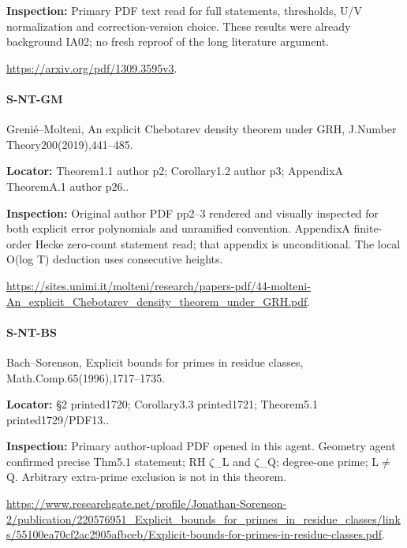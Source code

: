 \documentclass[11pt,a4paper]{article}
\begin{document}
\textbf{Inspection:} Primary PDF text read for full statements, thresholds, U/\allowbreak{}V normalization and correction-version choice.\allowbreak{} These results were already background IA02; no fresh reproof of the long literature argument.\allowbreak{}

\url{https://arxiv.org/pdf/1309.3595v3}.

\paragraph{S-NT-GM} Grenié–\allowbreak{}Molteni, An explicit Chebotarev density theorem under GRH, J.\allowbreak{}Number Theory200(2019),441–\allowbreak{}485.

\textbf{Locator:} Theorem1.\allowbreak{}1 author p2; Corollary1.\allowbreak{}2 author p3; AppendixA TheoremA.\allowbreak{}1 author p26.\allowbreak{}.

\textbf{Inspection:} Original author PDF pp2–\allowbreak{}3 rendered and visually inspected for both explicit error polynomials and unramified convention.\allowbreak{} AppendixA finite-order Hecke zero-count statement read; that appendix is unconditional.\allowbreak{} The local O(log T) deduction uses consecutive heights.\allowbreak{}

\url{https://sites.unimi.it/molteni/research/papers-pdf/44-molteni-An_explicit_Chebotarev_density_theorem_under_GRH.pdf}.

\paragraph{S-NT-BS} Bach–\allowbreak{}Sorenson, Explicit bounds for primes in residue classes, Math.\allowbreak{}Comp.\allowbreak{}65(1996),1717–\allowbreak{}1735.

\textbf{Locator:} §2 printed1720; Corollary3.\allowbreak{}3 printed1721; Theorem5.\allowbreak{}1 printed1729/\allowbreak{}PDF13.\allowbreak{}.

\textbf{Inspection:} Primary author-upload PDF opened in this agent.\allowbreak{} Geometry agent confirmed precise Thm5.\allowbreak{}1 statement; RH \ensuremath{\zeta}\_\allowbreak{}L and \ensuremath{\zeta}\_\allowbreak{}Q; degree-one prime; L\ensuremath{\ne}Q.\allowbreak{} Arbitrary extra-prime exclusion is not in this theorem.\allowbreak{}

\url{https://www.researchgate.net/profile/Jonathan-Sorenson-2/publication/220576951_Explicit_bounds_for_primes_in_residue_classes/links/55100ea70cf2ac2905afbceb/Explicit-bounds-for-primes-in-residue-classes.pdf}.
\end{document}
